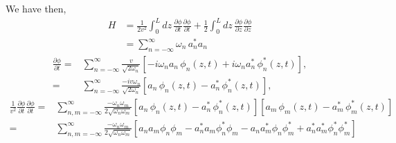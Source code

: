 We have then,
\begin{align}
\label{eq:12}
  H&=\frac{1}{2v^2}\int_0^Ldz\,\frac{\partial\phi}{\partial t}\frac{\partial\phi}{\partial t}+
  \frac{1}{2}\int_0^Ldz\,\frac{\partial\phi}{\partial z}\frac{\partial\phi}{\partial z}\nonumber\\
&=\sum_{n=-\infty}^\infty\omega_n\,a_n^*a_n
\end{align}
\begin{align}
  \frac{\partial\phi}{\partial t}=&\sum_{n=-\infty}^\infty \frac{v}{\sqrt{2\omega_n}}
  \left[-i\omega_n a_n\,\phi_n(z,t)+i\omega_n a_n^*\,\phi_n^*(z,t)\right],\nonumber\\
=&\sum_{n=-\infty}^\infty\frac{-i v\omega_n}{\sqrt{2\omega_n}}
  \left[a_n\,\phi_n(z,t)- a_n^*\,\phi_n^*(z,t)\right],
\end{align}
\begin{align}
\frac{1}{v^2}   \frac{\partial\phi}{\partial t} \frac{\partial\phi}{\partial t}=&
\sum_{n,m=-\infty}^\infty\frac{- \omega_n\omega_m}{2\sqrt{\omega_n\omega_m}}
  \left[a_n\,\phi_n(z,t)- a_n^*\,\phi_n^*(z,t)\right]
\left[a_m\,\phi_m(z,t)- a_m^*\,\phi_m^*(z,t)\right]\\
=  &
\sum_{n,m=-\infty}^\infty\frac{- \omega_n\omega_m}{2\sqrt{\omega_n\omega_m}}
  \left[a_n a_m \phi_n \phi_m- a_n^*a_m\phi_n^*\phi_m-a_n a_m^* \phi_n \phi_m^*+ a_n^*a_m^*\phi_n^*\phi_m^*\right]
\end{align}

